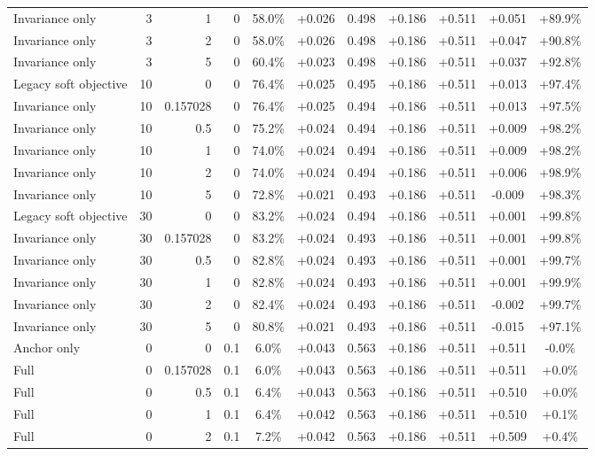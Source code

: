 \begin{table}[htbp]
\begin{tabular}{lrrrccccccc}
Invariance only & 3 & 1 & 0 & 58.0\% & +0.026 & 0.498 & +0.186 & +0.511 & +0.051 & +89.9\% \\
Invariance only & 3 & 2 & 0 & 58.0\% & +0.026 & 0.498 & +0.186 & +0.511 & +0.047 & +90.8\% \\
Invariance only & 3 & 5 & 0 & 60.4\% & +0.023 & 0.498 & +0.186 & +0.511 & +0.037 & +92.8\% \\
Legacy soft objective & 10 & 0 & 0 & 76.4\% & +0.025 & 0.495 & +0.186 & +0.511 & +0.013 & +97.4\% \\
Invariance only & 10 & 0.157028 & 0 & 76.4\% & +0.025 & 0.494 & +0.186 & +0.511 & +0.013 & +97.5\% \\
Invariance only & 10 & 0.5 & 0 & 75.2\% & +0.024 & 0.494 & +0.186 & +0.511 & +0.009 & +98.2\% \\
Invariance only & 10 & 1 & 0 & 74.0\% & +0.024 & 0.494 & +0.186 & +0.511 & +0.009 & +98.2\% \\
Invariance only & 10 & 2 & 0 & 74.0\% & +0.024 & 0.494 & +0.186 & +0.511 & +0.006 & +98.9\% \\
Invariance only & 10 & 5 & 0 & 72.8\% & +0.021 & 0.493 & +0.186 & +0.511 & -0.009 & +98.3\% \\
Legacy soft objective & 30 & 0 & 0 & 83.2\% & +0.024 & 0.494 & +0.186 & +0.511 & +0.001 & +99.8\% \\
Invariance only & 30 & 0.157028 & 0 & 83.2\% & +0.024 & 0.493 & +0.186 & +0.511 & +0.001 & +99.8\% \\
Invariance only & 30 & 0.5 & 0 & 82.8\% & +0.024 & 0.493 & +0.186 & +0.511 & +0.001 & +99.7\% \\
Invariance only & 30 & 1 & 0 & 82.8\% & +0.024 & 0.493 & +0.186 & +0.511 & +0.001 & +99.9\% \\
Invariance only & 30 & 2 & 0 & 82.4\% & +0.024 & 0.493 & +0.186 & +0.511 & -0.002 & +99.7\% \\
Invariance only & 30 & 5 & 0 & 80.8\% & +0.021 & 0.493 & +0.186 & +0.511 & -0.015 & +97.1\% \\
Anchor only & 0 & 0 & 0.1 & 6.0\% & +0.043 & 0.563 & +0.186 & +0.511 & +0.511 & -0.0\% \\
Full & 0 & 0.157028 & 0.1 & 6.0\% & +0.043 & 0.563 & +0.186 & +0.511 & +0.511 & +0.0\% \\
Full & 0 & 0.5 & 0.1 & 6.4\% & +0.043 & 0.563 & +0.186 & +0.511 & +0.510 & +0.0\% \\
Full & 0 & 1 & 0.1 & 6.4\% & +0.042 & 0.563 & +0.186 & +0.511 & +0.510 & +0.1\% \\
Full & 0 & 2 & 0.1 & 7.2\% & +0.042 & 0.563 & +0.186 & +0.511 & +0.509 & +0.4\% \\

\end{tabular}
\end{table}
